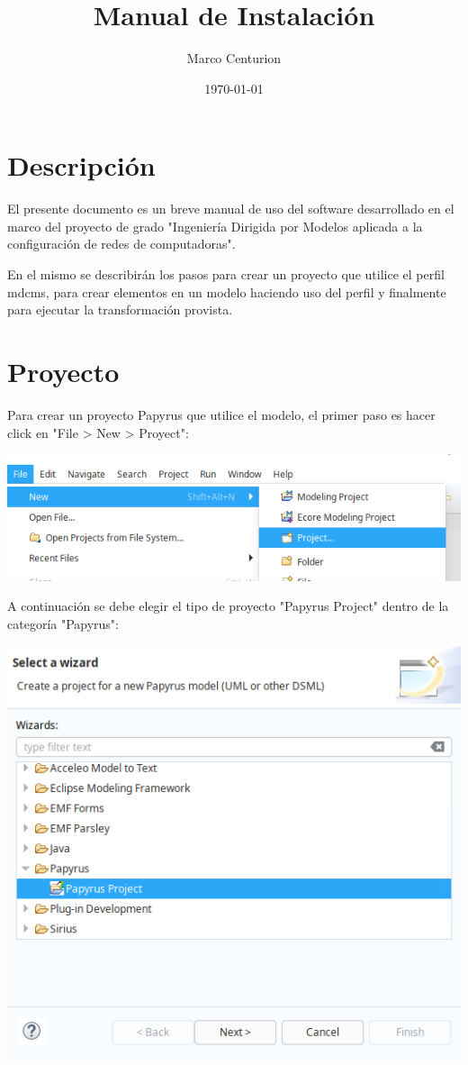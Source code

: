 \documentclass[11pt]{article}
\author{Marco Centurion}
\date{\today}
\title{Manual de Instalación}
\begin{document}
\maketitle
\tableofcontents


\section{Descripción}
\label{sec:org17588f2}

El presente documento es un breve manual de uso del software
desarrollado en el marco del proyecto de grado "Ingeniería Dirigida
por Modelos aplicada a la configuración de redes de computadoras".

En el mismo se describirán los pasos para crear un proyecto que
utilice el perfil mdcms, para crear elementos en un modelo haciendo
uso del perfil y finalmente para ejecutar la transformación provista.

\section{Proyecto}
\label{sec:org66c8ddb}

Para crear un proyecto Papyrus que utilice el modelo, el primer paso
es hacer click en "File > New > Proyect":

\begin{center}
\includegraphics[width=.9\linewidth]{images/proyecto_1.png}
\end{center}

A continuación se debe elegir el tipo de proyecto "Papyrus Project"
dentro de la categoría "Papyrus":

\begin{center}
\includegraphics[width=.9\linewidth]{images/proyecto_2.png}
\end{center}
\end{document}
